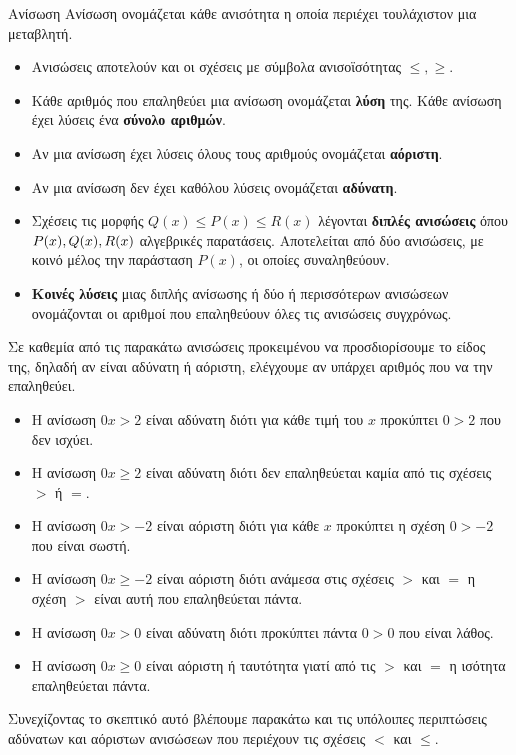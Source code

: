 \begin{orismos}{Ανίσωση}
Ανίσωση ονομάζεται κάθε ανισότητα η οποία περιέχει τουλάχιστον μια μεταβλητή.
\end{orismos}
\begin{itemize}[itemsep=0mm]
\item Ανισώσεις αποτελούν και οι σχέσεις με σύμβολα ανισοϊσότητας $ \leq,\geq $.
\item Κάθε αριθμός που επαληθεύει μια ανίσωση ονομάζεται \textbf{λύση} της. Κάθε ανίσωση έχει λύσεις ένα \textbf{σύνολο αριθμών}.
\item Αν μια ανίσωση έχει λύσεις όλους τους αριθμούς ονομάζεται \textbf{αόριστη}.
\item Αν μια ανίσωση δεν έχει καθόλου λύσεις ονομάζεται \textbf{αδύνατη}.
\item Σχέσεις τις μορφής $ Q(x)\leq P(x)\leq R(x) $ λέγονται \textbf{διπλές ανισώσεις} όπου $ P(x),Q(x),\\R(x) $ αλγεβρικές παρατάσεις. Αποτελείται από δύο ανισώσεις, με κοινό μέλος την παράσταση $ P(x) $, οι οποίες συναληθεύουν.
\item \textbf{Κοινές λύσεις} μιας διπλής ανίσωσης ή δύο ή περισσότερων ανισώσεων ονομάζονται οι αριθμοί που επαληθεύουν όλες τις ανισώσεις συγχρόνως.
\end{itemize}
Σε καθεμία από τις παρακάτω ανισώσεις προκειμένου να προσδιορίσουμε το είδος της, δηλαδή αν είναι αδύνατη ή αόριστη, ελέγχουμε αν υπάρχει αριθμός που να την επαληθεύει.
\begin{itemize}
\item Η ανίσωση $ 0x>2 $ είναι αδύνατη διότι για κάθε τιμή του $ x $ προκύπτει $ 0>2 $ που δεν ισχύει.
\item Η ανίσωση $ 0x\geq2 $ είναι αδύνατη διότι δεν επαληθεύεται καμία από τις σχέσεις $ > $ ή $ = $.
\item Η ανίσωση $ 0x>-2 $ είναι αόριστη διότι για κάθε $ x $ προκύπτει η σχέση $ 0>-2 $ που είναι σωστή.
\item Η ανίσωση $ 0x\geq-2 $ είναι αόριστη διότι ανάμεσα στις σχέσεις $ > $ και $ = $ η σχέση $ > $ είναι αυτή που επαληθεύεται πάντα.
\item Η ανίσωση $ 0x>0 $ είναι αδύνατη διότι προκύπτει πάντα $ 0>0 $ που είναι λάθος.
\item Η ανίσωση $ 0x\geq0 $ είναι αόριστη ή ταυτότητα γιατί από τις $ > $ και $ = $ η ισότητα επαληθεύεται πάντα.
\end{itemize}
Συνεχίζοντας το σκεπτικό αυτό βλέπουμε παρακάτω και τις υπόλοιπες περιπτώσεις αδύνατων και αόριστων ανισώσεων που περιέχουν τις σχέσεις $ < $ και $ \leq $.
